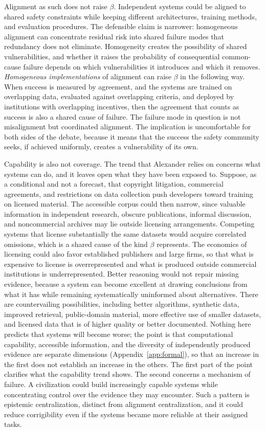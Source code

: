 \documentclass[11pt]{article}
\begin{document}
Alignment as such does not raise $\beta$. Independent systems could be aligned to shared safety constraints while keeping different architectures, training methods, and evaluation procedures. The defensible claim is narrower: homogeneous alignment can concentrate residual risk into shared failure modes that redundancy does not eliminate. Homogeneity creates the possibility of shared vulnerabilities, and whether it raises the probability of consequential common-cause failure depends on which vulnerabilities it introduces and which it removes. \emph{Homogeneous implementations} of alignment can raise $\beta$ in the following way. When success is measured by agreement, and the systems are trained on overlapping data, evaluated against overlapping criteria, and deployed by institutions with overlapping incentives, then the agreement that counts as success is also a shared cause of failure. The failure mode in question is not misalignment but coordinated alignment. The implication is uncomfortable for both sides of the debate, because it means that the success the safety community seeks, if achieved uniformly, creates a vulnerability of its own.

Capability is also not coverage. The trend that Alexander relies on concerns what systems can do, and it leaves open what they have been exposed to. Suppose, as a conditional and not a forecast, that copyright litigation, commercial agreements, and restrictions on data collection push developers toward training on licensed material. The accessible corpus could then narrow, since valuable information in independent research, obscure publications, informal discussion, and noncommercial archives may lie outside licensing arrangements. Competing systems that license substantially the same datasets would acquire correlated omissions, which is a shared cause of the kind $\beta$ represents. The economics of licensing could also favor established publishers and large firms, so that what is expensive to license is overrepresented and what is produced outside commercial institutions is underrepresented. Better reasoning would not repair missing evidence, because a system can become excellent at drawing conclusions from what it has while remaining systematically uninformed about alternatives. There are countervailing possibilities, including better algorithms, synthetic data, improved retrieval, public-domain material, more effective use of smaller datasets, and licensed data that is of higher quality or better documented. Nothing here predicts that systems will become worse; the point is that computational capability, accessible information, and the diversity of independently produced evidence are separate dimensions (Appendix~\ref{app:formal}), so that an increase in the first does not establish an increase in the others. The first part of the point clarifies what the capability trend shows. The second concerns a mechanism of failure. A civilization could build increasingly capable systems while concentrating control over the evidence they may encounter. Such a pattern is epistemic centralization, distinct from alignment centralization, and it could reduce corrigibility even if the systems became more reliable at their assigned tasks.
\end{document}
